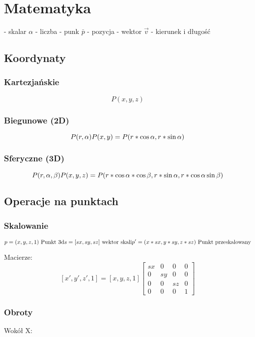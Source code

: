 \documentclass{article}
\begin{document}
\tableofcontents
\newpage
\section{Matematyka}
- skalar $\alpha$ - liczba
- punk $\bar{p}$ - pozycja
- wektor $\vec{v}$ - kierunek i długość

\subsection{Koordynaty}
\subsubsection{Kartezjańskie}
$$P(x, y, z)$$

\subsubsection{Biegunowe (2D)}
$$P(r, \alpha)\\
P(x,y) = P(r * \cos\alpha, r * \sin\alpha)$$
\subsubsection{Sferyczne (3D)}
$$P(r, \alpha, \beta)\\
P(x, y, z) = P(r*\cos\alpha*\cos\beta, r*\sin\alpha, r*\cos\alpha\sin\beta)$$

\subsection{Operacje na punktach}
\subsubsection{Skalowanie}

$$
p = (x,y,z,1)\ \text{Punkt 3d}\\
s = [sx, sy, sz]\ \text{wektor skali}\\
p' = (x * sx, y * sy, z*sz)\ \text{Punkt przeskalowany}
$$

Macierze:
$$
[x', y', z', 1] = [x, y, z, 1]
\begin{bmatrix}
sx & 0 & 0 & 0\\
0 & sy & 0 & 0\\
0 & 0 & sz & 0\\
0 & 0 & 0 & 1
\end{bmatrix}
$$

\subsubsection{Obroty}
Wokół X:
\end{document}

